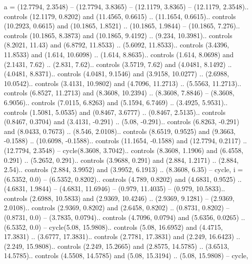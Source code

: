 {a} = {(12.7794, 2.3548) -- (12.7794, 3.8365) -- (12.1179, 3.8365) -- (12.1179, 2.3548).. controls (12.1179, 0.8202) and (11.4565, 0.6615) .. (11.1654, 0.6615).. controls (10.2923, 0.6615) and (10.1865, 1.8521) .. (10.1865, 1.9844) -- (10.1865, 7.276).. controls (10.1865, 8.3873) and (10.1865, 9.4192) .. (9.234, 10.3981).. controls (8.2021, 11.43) and (6.8792, 11.8533) .. (5.6092, 11.8533).. controls (3.4396, 11.8533) and (1.614, 10.6098) .. (1.614, 8.8635).. controls (1.614, 8.0698) and (2.1431, 7.62) .. (2.831, 7.62).. controls (3.5719, 7.62) and (4.0481, 8.1492) .. (4.0481, 8.8371).. controls (4.0481, 9.1546) and (3.9158, 10.0277) .. (2.6988, 10.0542).. controls (3.4131, 10.9802) and (4.7096, 11.2713) .. (5.5563, 11.2713).. controls (6.8527, 11.2713) and (8.3608, 10.2394) .. (8.3608, 7.8846) -- (8.3608, 6.9056).. controls (7.0115, 6.8263) and (5.1594, 6.7469) .. (3.4925, 5.9531).. controls (1.5081, 5.0535) and (0.8467, 3.6777) .. (0.8467, 2.5135).. controls (0.8467, 0.3704) and (3.4131, -0.291) .. (5.08, -0.291).. controls (6.8263, -0.291) and (8.0433, 0.7673) .. (8.546, 2.0108).. controls (8.6519, 0.9525) and (9.3663, -0.1588) .. (10.6098, -0.1588).. controls (11.1654, -0.1588) and (12.7794, 0.2117) .. (12.7794, 2.3548) -- cycle(8.3608, 3.7042).. controls (8.3608, 1.1906) and (6.4558, 0.291) .. (5.2652, 0.291).. controls (3.9688, 0.291) and (2.884, 1.2171) .. (2.884, 2.54).. controls (2.884, 3.9952) and (3.9952, 6.1913) .. (8.3608, 6.35) -- cycle},
{i} = {(6.5352, 0.0) -- (6.5352, 0.8202).. controls (4.789, 0.8202) and (4.6831, 0.9525) .. (4.6831, 1.9844) -- (4.6831, 11.6946) -- (0.979, 11.4035) -- (0.979, 10.5833).. controls (2.6988, 10.5833) and (2.9369, 10.4246) .. (2.9369, 9.1281) -- (2.9369, 2.0108).. controls (2.9369, 0.8202) and (2.6458, 0.8202) .. (0.8731, 0.8202) -- (0.8731, 0.0) -- (3.7835, 0.0794).. controls (4.7096, 0.0794) and (5.6356, 0.0265) .. (6.5352, 0.0) -- cycle(5.08, 15.9808).. controls (5.08, 16.6952) and (4.4715, 17.3831) .. (3.6777, 17.3831).. controls (2.7781, 17.3831) and (2.249, 16.6423) .. (2.249, 15.9808).. controls (2.249, 15.2665) and (2.8575, 14.5785) .. (3.6513, 14.5785).. controls (4.5508, 14.5785) and (5.08, 15.3194) .. (5.08, 15.9808) -- cycle},
